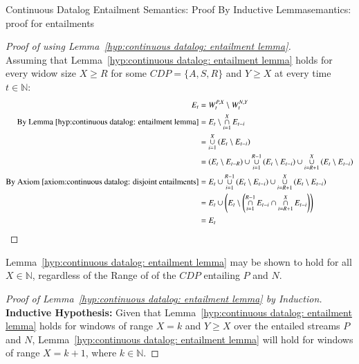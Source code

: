 \begin{nestedsection}{Continuous Datalog Entailment Semantics: Proof By Inductive Lemma}{semantics: proof for entailments}
	\begin{proof}[Proof of  using Lemma~\ref{hyp:continuous datalog: entailment lemma}]\hfill\\
		Assuming that Lemma~\ref{hyp:continuous datalog: entailment lemma} holds for every widow size ${X \geq R}$ for some ${CDP = \{A,S,R\}}$ and ${Y \geq X}$ at every time ${t \in \mathbb{N}}$:
		\begin{align*}
			E_t & = W^{P,X}_t \setminus W^{N,Y}_t \\
			\text{By Lemma~\ref{hyp:continuous datalog: entailment lemma}} & = E_t \setminus \mathop{\cap}^{X}_{i=1} E_{t-i} \\
			& = \mathop{\cup}^{X}_{i=1} \left( E_t \setminus E_{t-i} \right) \\
			& = \left( E_t \setminus E_{t-R} \right) \cup \mathop{\cup}^{R-1}_{i=1} \left( E_t \setminus E_{t-i} \right) \cup \mathop{\cup}^{X}_{i=R+1} \left( E_t \setminus E_{t-i} \right) \\
			\text{By Axiom~\ref{axiom:continuous datalog: disjoint entailments}} & = E_t \cup \mathop{\cup}^{R-1}_{i=1} \left( E_t \setminus E_{t-i} \right) \cup \mathop{\cup}^{X}_{i=R+1} \left( E_t \setminus E_{t-i} \right) \\
			& = E_t \cup \left( E_t \setminus \left( \mathop{\cap}^{R-1}_{i=1} E_{t-i} \cap \mathop{\cap}^{X}_{i=R+1} E_{t-i} \right) \right) \\
			& = E_t \qedhere
		\end{align*}
	\end{proof}

	Lemma~\ref{hyp:continuous datalog: entailment lemma} may be shown to hold for all ${X \in \mathbb{N}}$, regardless of the Range of of the ${CDP}$ entailing $P$ and $N$.

	\begin{proof}[Proof of Lemma~\ref{hyp:continuous datalog: entailment lemma} by Induction]
		\textbf{Inductive Hypothesis:} Given that Lemma~\ref{hyp:continuous datalog: entailment lemma} holds for windows of range ${X = k}$ and ${Y \geq X}$ over the entailed streams $P$ and $N$, Lemma~\ref{hyp:continuous datalog: entailment lemma} will hold for windows of range ${X = k + 1}$, where ${k \in \mathbb{N}}$.


\end{proof}
\end{nestedsection}
